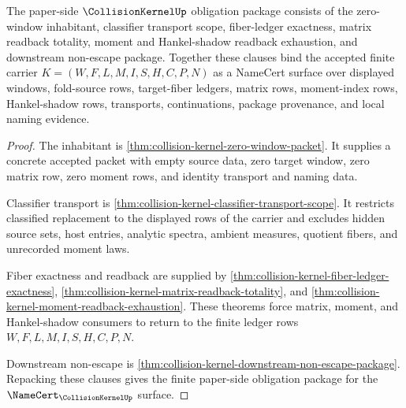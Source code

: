 \begin{theorem}
\label{thm:collision-kernel-obligation-closure-package}
The paper-side $\CollisionKernelUp$ obligation package consists of the zero-window inhabitant, classifier transport scope, fiber-ledger exactness, matrix readback totality, moment and Hankel-shadow readback exhaustion, and downstream non-escape package. Together these clauses bind the accepted finite carrier $K=(W,F,L,M,I,S,H,C,P,N)$ as a NameCert surface over displayed windows, fold-source rows, target-fiber ledgers, matrix rows, moment-index rows, Hankel-shadow rows, transports, continuations, package provenance, and local naming evidence.
\end{theorem}
\begin{proof}
The inhabitant is \autoref{thm:collision-kernel-zero-window-packet}. It supplies a concrete accepted packet with empty source data, zero target window, zero matrix row, zero moment rows, and identity transport and naming data.

Classifier transport is \autoref{thm:collision-kernel-classifier-transport-scope}. It restricts classified replacement to the displayed rows of the carrier and excludes hidden source sets, host entries, analytic spectra, ambient measures, quotient fibers, and unrecorded moment laws.

Fiber exactness and readback are supplied by \autoref{thm:collision-kernel-fiber-ledger-exactness}, \autoref{thm:collision-kernel-matrix-readback-totality}, and \autoref{thm:collision-kernel-moment-readback-exhaustion}. These theorems force matrix, moment, and Hankel-shadow consumers to return to the finite ledger rows $W,F,L,M,I,S,H,C,P,N$.

Downstream non-escape is \autoref{thm:collision-kernel-downstream-non-escape-package}. Repacking these clauses gives the finite paper-side obligation package for the $\NameCert_{\CollisionKernelUp}$ surface.
\end{proof}


